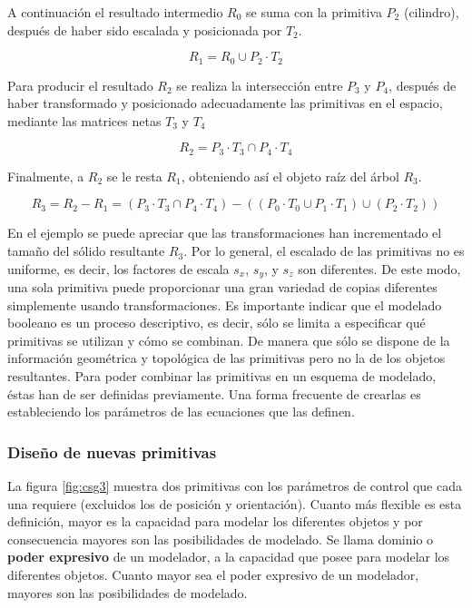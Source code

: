 A continuación el resultado intermedio $R_0$ se suma con la primitiva $P_2$ (cilindro), después de haber sido escalada y posicionada por $T_2$.

\begin{equation}
R_1 = R_0 \cup P_2\cdot T_2
\end{equation}

Para producir el resultado $R_2$ se realiza la intersección entre $P_3$ y $P_4$, después de haber transformado y posicionado adecuadamente las primitivas en el espacio, mediante las matrices netas $T_3$ y $T_4$

\begin{equation}
R_2 = P_3\cdot T_3 \cap P_4\cdot T_4
\end{equation}

Finalmente, a $R_2$ se le resta $R_1$, obteniendo así el objeto raíz del árbol $R_3$.


\begin{equation}
R_3 = R_2 - R_1 = (P_3\cdot T_3 \cap P_4\cdot T_4) - ((P_0\cdot T_0 \cup P_1\cdot T_1) \cup (P_2\cdot T_2))
\end{equation}

En el ejemplo se puede apreciar que las transformaciones han incrementado el tamaño del sólido resultante $R_3$. Por lo general, el escalado de las primitivas no es uniforme, es decir, los factores de escala $s_x$, $s_y$, y $s_z$ son diferentes. De este modo, una sola primitiva puede proporcionar una gran variedad de copias diferentes simplemente usando transformaciones. \newline
Es importante indicar que el modelado booleano es un proceso descriptivo, es decir, sólo se limita a especificar qué primitivas se utilizan y cómo se combinan. De manera que sólo se dispone de la información geométrica y topológica de las primitivas pero no la de los objetos resultantes. Para poder combinar las primitivas en un esquema de modelado, éstas han de ser definidas previamente. Una forma frecuente de crearlas es estableciendo los parámetros de las ecuaciones que las definen. 


\subsubsection{Diseño de nuevas primitivas}
La figura \ref{fig:csg3} muestra dos primitivas con los parámetros de control que cada una requiere (excluidos los de posición y orientación). Cuanto más flexible es esta definición, mayor es la capacidad para modelar los diferentes objetos y por consecuencia mayores son las posibilidades de modelado.\newline
Se llama dominio o \textbf{poder expresivo} de un modelador, a la capacidad que posee para modelar los diferentes objetos. Cuanto mayor sea el poder expresivo de un modelador, mayores son las posibilidades de modelado. 

